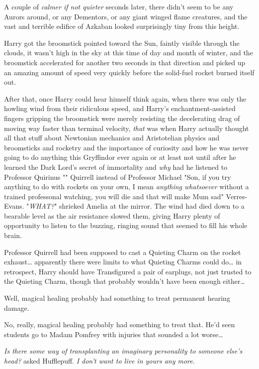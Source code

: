 A couple of \emph{calmer if not quieter} seconds later, there didn't seem to be
any Aurors around, or any Dementors, or any giant winged flame creatures, and
the vast and terrible edifice of Azkaban looked surprisingly tiny from this
height.

Harry got the broomstick pointed toward the Sun, faintly visible through the
clouds, it wasn't high in the sky at this time of day and month of winter, and
the broomstick accelerated for another two seconds in that direction and picked
up an amazing amount of speed very quickly before the solid-fuel rocket burned
itself out.

After that, once Harry could hear himself think again, when there was only the
howling wind from their ridiculous speed, and Harry's enchantment-assisted
fingers gripping the broomstick were merely resisting the decelerating drag of
moving way faster than terminal velocity, \emph{that} was when Harry actually
thought all that stuff about Newtonian mechanics and Aristotelian physics and
broomsticks and rocketry and the importance of curiosity and how he was never
going to do anything this Gryffindor ever again or at least not until after he
learned the Dark Lord's secret of immortality and \emph{why} had he listened to
Professor Quirinus "" Quirrell instead of Professor Michael
"Son, if you try anything to do with rockets on your own, I mean \emph{anything
whatsoever} without a trained professonal watching, you will die and that will
make Mum sad" Verres-Evans.
\later
"\emph{WHAT?}" shrieked Amelia at the mirror.
\later
The wind had died down to a bearable level as the air resistance slowed them,
giving Harry plenty of opportunity to listen to the buzzing, ringing sound that
seemed to fill his whole brain.

Professor Quirrell had been supposed to cast a Quieting Charm on the rocket
exhaust{\ldots} apparently there were limits to what Quieting Charms could
do{\ldots} in retrospect, Harry should have Transfigured a pair of earplugs,
not just trusted to the Quieting Charm, though that probably wouldn't have been
enough either{\ldots}

Well, magical healing probably had something to treat permanent hearing damage.

No, really, magical healing probably had something to treat that. He'd seen
students go to Madam Pomfrey with injuries that sounded a lot worse{\ldots}

\emph{Is there some way of transplanting an imaginary personality to someone
else's head?} asked Hufflepuff. \emph{I don't want to live in yours any more.}

